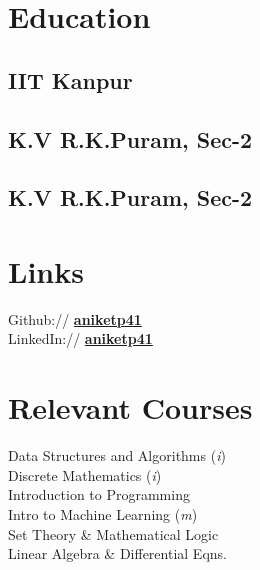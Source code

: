 \documentclass[]{deedy-resume-openfont}
\begin{document}
\begin{minipage}[t]{0.31\textwidth} 


\section{Education} 

\subsection{IIT Kanpur}
\sectionsep{}

\subsection{K.V R.K.Puram, Sec-2}
\sectionsep{}

\subsection{K.V R.K.Puram, Sec-2}


\section{Links} 
Github:// \href{https://github.com/aniketp41}{\bf aniketp41} \\
LinkedIn://  \href{https://www.linkedin.com/in/aniketp41}{\bf aniketp41} \\



\section{Relevant Courses}
Data Structures and Algorithms (\textit{i}) \\
Discrete Mathematics (\textit{i}) \\
Introduction to Programming \\
Intro to Machine Learning (\textit{m}) \\
Set Theory \& Mathematical Logic \\
Linear Algebra \& Differential Eqns.


\end{minipage}
\end{document}
